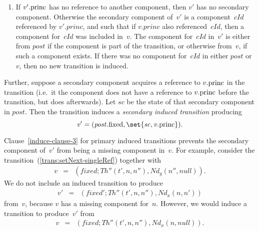 \begin{definition}
\begin{enumerate}
\item\label{induce-clause-3}
  If $v'.\mathrm{princ}$ has no reference to another component, then $v'$ has no
  secondary component.  Otherwise the secondary component of~$v'$ is a
  component~$cId$ referenced by $v'.princ$, and such that if $v.princ$ also
  referenced~$cId$, then a component for~$cId$ was included in~$v$.  The
  component for~$cId$ in~$v'$ is either from $post$ if the component is part
  of the transition, or otherwise from~$v$, if such a component exists.  If
  there was no component for~$cId$ in either $post$ or~$v$, then no new
  transition is induced.
\end{enumerate}
%

Further, suppose a secondary component acquires a reference to $v.\mathrm{princ}$ in
the transition (i.e.~it the component does not have a reference to $v.\mathrm{princ}$
before the transition, but does afterwards).  Let $sc$ be the state of that
secondary component in $post$.  Then the transition induces a \emph{secondary
  induced transition} producing
\[\mit
v' = (post.\fixed, \set{sc, v.\princ}).
\]
\end{definition}


Clause~\ref{induce-clause-3} for primary induced transitions prevents the
secondary component of~$v'$ from being a missing component in~$v$.  For
example, consider the transition~(\ref{trans:setNext-singleRef}) together with
\begin{eqnarray*}
v & = & (fixed; Th''(t', n, n''), Nd_y(n'',null)) .
\end{eqnarray*}
%
We do not include an induced transition to produce
\begin{eqnarray*}
v' & = & (fixed'; Th''(t', n, n''),  Nd_x(n, n'))
\end{eqnarray*}
from~$v$, because $v$ has a missing component for~$n$.  However, we would
induce a transition to produce~$v'$ from
\begin{eqnarray*}
v & = & (fixed; Th''(t', n, n''),Nd_x(n, null) ).
\end{eqnarray*}

